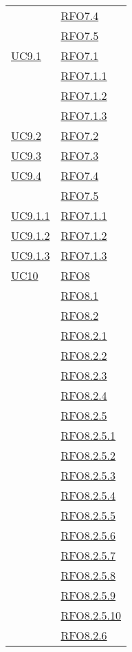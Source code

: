 \begin{longtable}{|>{\centering}m{5cm}|m{5cm}<{\centering}|}
& \hyperlink{RFO7.4}{RFO7.4}\\
& \hyperlink{RFO7.5}{RFO7.5}\\\hline
\hyperlink{UC9.1}{UC9.1} & \hyperlink{RFO7.1}{RFO7.1}\\
& \hyperlink{RFO7.1.1}{RFO7.1.1}\\
& \hyperlink{RFO7.1.2}{RFO7.1.2}\\
& \hyperlink{RFO7.1.3}{RFO7.1.3}\\\hline
\hyperlink{UC9.2}{UC9.2} & \hyperlink{RFO7.2}{RFO7.2}\\\hline
\hyperlink{UC9.3}{UC9.3} & \hyperlink{RFO7.3}{RFO7.3}\\\hline
\hyperlink{UC9.4}{UC9.4} & \hyperlink{RFO7.4}{RFO7.4}\\
& \hyperlink{RFO7.5}{RFO7.5}\\\hline
\hyperlink{UC9.1.1}{UC9.1.1} & \hyperlink{RFO7.1.1}{RFO7.1.1}\\\hline
\hyperlink{UC9.1.2}{UC9.1.2} & \hyperlink{RFO7.1.2}{RFO7.1.2}\\\hline
\hyperlink{UC9.1.3}{UC9.1.3} & \hyperlink{RFO7.1.3}{RFO7.1.3}\\\hline
\hyperlink{UC10}{UC10} & \hyperlink{RFO8}{RFO8}\\
& \hyperlink{RFO8.1}{RFO8.1}\\
& \hyperlink{RFO8.2}{RFO8.2}\\
& \hyperlink{RFO8.2.1}{RFO8.2.1}\\
& \hyperlink{RFO8.2.2}{RFO8.2.2}\\
& \hyperlink{RFO8.2.3}{RFO8.2.3}\\
& \hyperlink{RFO8.2.4}{RFO8.2.4}\\
& \hyperlink{RFO8.2.5}{RFO8.2.5}\\
& \hyperlink{RFO8.2.5.1}{RFO8.2.5.1}\\
& \hyperlink{RFO8.2.5.2}{RFO8.2.5.2}\\
& \hyperlink{RFO8.2.5.3}{RFO8.2.5.3}\\
& \hyperlink{RFO8.2.5.4}{RFO8.2.5.4}\\
& \hyperlink{RFO8.2.5.5}{RFO8.2.5.5}\\
& \hyperlink{RFO8.2.5.6}{RFO8.2.5.6}\\
& \hyperlink{RFO8.2.5.7}{RFO8.2.5.7}\\
& \hyperlink{RFO8.2.5.8}{RFO8.2.5.8}\\
& \hyperlink{RFO8.2.5.9}{RFO8.2.5.9}\\
& \hyperlink{RFO8.2.5.10}{RFO8.2.5.10}\\
& \hyperlink{RFO8.2.6}{RFO8.2.6}\\

\end{longtable}
